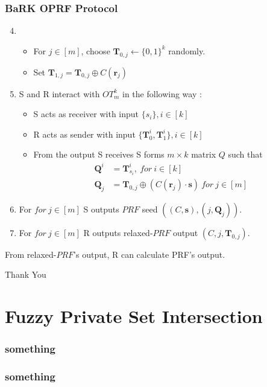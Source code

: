 \documentclass[hyperref={pdfpagelabels=false}]{beamer}
\theoremstyle{remark}
\begin{document}
\begin{frame}
\frametitle{BaRK OPRF Protocol}
\begin{enumerate}
\setcounter{enumi}{3}
\item[] \begin{itemize}
\item For $j \in [m]$, choose $\mathbf{T}_{0,j} \leftarrow \{0,1\}^k$ randomly.\pause
\item Set $\mathbf{T}_{1,j} = \mathbf{T}_{0,j} \oplus C(\mathbf{r}_j)$\pause
\end{itemize}
\item S and R interact with $OT_m^k$ in the following way :\pause
\begin{itemize}
\item S acts as receiver with input $\{s_i\}, i \in [k]$\pause
\item R acts as sender with input $\{\mathbf{T}_0^i,\mathbf{T}_1^i\}, i \in [k]$\pause
\item From the output S receives S forms $m\times k$ matrix $Q$ such that 
\begin{align*}
\mathbf{Q}^i &= \mathbf{T}_{s_i}^i, \ for\  i \in [k] \\
\mathbf{Q}_j &= \mathbf{T}_{0,j} \oplus (C(\mathbf{r}_j) \cdot \mathbf{s}) \ for \ j \in [m]
\end{align*}
\end{itemize}\pause
\item For $for \ j \in [m]$ S outputs $PRF$ seed $((C,\mathbf{s}),(j,\mathbf{Q}_j))$.\pause
\item For $for \ j \in [m]$ R outputs relaxed-$PRF$ output $(C,j,\mathbf{T}_{0,j})$.\pause
\end{enumerate}
From relaxed-$PRF$'s output, R can calculate PRF's output.
\end{frame}


\begin{frame}
\begin{center}
\Huge Thank You \smiley{}
\end{center}
\end{frame}

\section{Fuzzy Private Set Intersection}
\begin{frame}
\frametitle{something}
\end{frame}

\begin{frame}
\frametitle{something}
\end{frame}
\end{document}
